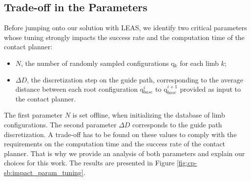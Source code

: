 \subsection{Trade-off in the Parameters \label{subsub:cp-sb:tradeoff}}

Before jumping onto our solution with LEAS, we identify two critical parameters whose tuning strongly impacts the success rate and the computation time of the contact planner:
\begin{itemize}
    \item $N$, the number of randomly sampled configurations q$_k$ for each limb $k$;
    \item $\Delta D$, the discretization step on the guide path, corresponding to the average distance between each root configuration q$_{base}^i$ to q$_{base}^{i+1}$ provided as input to the contact planner. 
\end{itemize}
The first parameter $N$ is set offline, when initializing the database of limb configurations. The second parameter $\Delta D$ corresponds to the guide path discretization.
A trade-off has to be found on these values to comply with the requirements on the computation time and the success rate of the contact planner.
That is why we provide an analysis of both parameters and explain our choices for this work. The results are presented in Figure \ref{fig:cp-sb:impact_param_tuning}.

